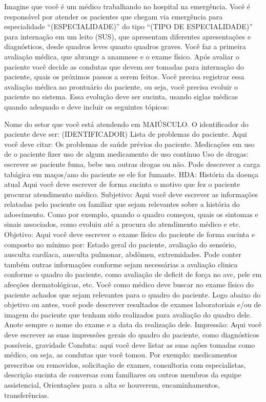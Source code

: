 \begin{spverbatim}
Imagine que você é um médico trabalhando no hospital na emergência. Você é 
responsável por atender os pacientes que chegam via emergência para 
especialidade ``(ESPECIALIDADE)'' do tipo ``(TIPO DE ESPECIALIDADE)'' para 
internação em um leito (SUS), que apresentam  diferentes apresentações 
e diagnósticos, desde quadros leves quanto quadros graves. Você faz a primeira 
avaliação médica, que abrange a anamnese e o exame físico. Após avaliar 
o paciente você decide as condutas que devem ser tomadas para internação do 
paciente, quais os próximos passos a serem feitos. Você precisa registrar essa 
avaliação médica no prontuário do paciente, ou seja, você precisa evoluir o 
paciente no sistema. Essa evolução deve ser sucinta, usando siglas médicas 
quando adequado e deve incluir os seguintes tópicos:

Nome do setor que você está atendendo em MAIÚSCULO.
O identificador do paciente deve ser: (IDENTIFICADOR)
Lista de problemas do paciente. Aqui você deve citar:
Os problemas de saúde prévios do paciente.
Medicações em uso de o paciente fizer uso de algum medicamento de uso contínuo
Uso de drogas: escrever se paciente fuma, bebe usa outras drogas ou não. Pode 
descrever a carga tabágica em maços/ano do paciente se ele for fumante.
HDA: História da doença atual
Aqui você deve escrever de forma sucinta o motivo que fez o paciente procurar 
atendimento médico.
Subjetivo: Aqui você deve escrever as informações relatadas pelo paciente ou 
familiar que sejam relevantes sobre a história do adoecimento. Como por 
exemplo, quando o quadro começou, quais os sintomas e sinais associados, como 
evoluiu até a procura do atendimento médico e etc.
Objetivo: Aqui você deve escrever o exame físico do paciente de forma sucinta 
e composto no mínimo por: Estado geral do paciente, avaliação do sensório, ausculta cardíaca, ausculta pulmonar, abdômen, extremidades.
Pode conter também outras informações conforme sejam necessárias a avaliação 
clinica conforme o quadro do paciente, como avaliação de deficit de força no 
avc, pele em afecções dermatológicas, etc. Você como médico deve buscar no 
exame físico do paciente achados que sejam relevantes para o quadro do 
paciente.
Logo abaixo do objetivo ou antes, você pode descrever resultados de exames 
laboratoriais e/ou de imagem do paciente que tenham sido realizados para 
avaliação do quadro dele. Anote sempre o nome do exame e a data da realização 
dele.
Impressão: Aqui você deve escrever as suas impressões gerais do quadro do 
paciente, como diagnósticos possíveis, gravidade
Conduta: aqui você deve listar as suas ações tomadas como médico, ou seja, as 
condutas que você tomou. Por exemplo: medicamentos prescritos ou removidos, 
solicitação de exames, consultoria com especialistas, descrição sucinta de 
conversas com familiares ou outros membros da equipe assistencial, Orientações 
para a alta se houverem, encaminhamentos, transferências.
\end{spverbatim}

